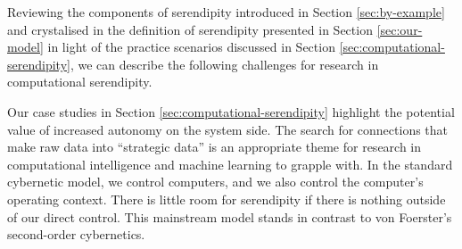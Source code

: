 




Reviewing the components of serendipity introduced in Section
\ref{sec:by-example} and crystalised in the definition of serendipity
presented in Section \ref{sec:our-model} in light of the practice
scenarios discussed in Section \ref{sec:computational-serendipity}, we
can describe the following challenges for research in computational
serendipity.

Our case studies in Section
  \ref{sec:computational-serendipity} highlight the potential value of
  increased autonomy on the system side.  The search for connections
  that make raw data into ``strategic data'' is an appropriate theme
  for research in computational intelligence and machine learning to
  grapple with.  In the standard cybernetic model, we control
  computers, and we also control the computer's operating context.
  There is little room for serendipity if there is nothing outside of
  our direct control.  This mainstream model stands in contrast to von
  Foerster's \cite{von2003cybernetics} second-order
  cybernetics. 



